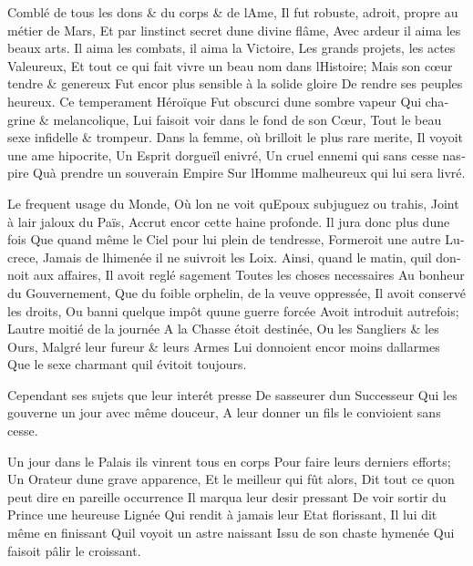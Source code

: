 \documentclass[14pt,a4paper]{memoir}
\begin{document}
{{\begin{otherlanguage}{french}
{Comblé de tous les dons \& du corps \& de l\textquotesingle Ame,} {Il
fut robuste, adroit, propre au métier de Mars, } {Et par
l\textquotesingle instinct secret d\textquotesingle une divine flâme,}
{Avec ardeur il aima les beaux arts.} {Il aima les combats, il aima la
Victoire,} {Les grands projets, les actes Valeureux,} {Et tout ce qui
fait vivre un beau nom dans l\textquotesingle Histoire;} {Mais son cœur
tendre \& genereux} {Fut encor plus sensible à la solide gloire} {De
rendre ses peuples heureux.} {Ce temperament Héroïque} {Fut obscurci
d\textquotesingle une sombre vapeur} {Qui chagrine \& melancolique,}
{Lui faisoit voir dans le fond de son Cœur, } {Tout le beau sexe
infidelle \& trompeur.} {Dans la femme, où brilloit le plus rare merite,
} {Il voyoit une ame hipocrite,} {Un Esprit d\textquotesingle orgueïl
enivré,} {Un cruel ennemi qui sans cesse n\textquotesingle aspire}
{Qu\textquotesingle à prendre un souverain Empire} {Sur
l\textquotesingle Homme malheureux qui lui sera livré.}

{Le frequent usage du Monde,} {Où l\textquotesingle on ne voit
qu\textquotesingle Epoux subjuguez ou trahis,} {Joint à
l\textquotesingle air jaloux du Païs,} {Accrut encor cette haine
profonde.} {Il jura donc plus d\textquotesingle une fois} {Que quand
même le Ciel pour lui plein de tendresse,} {Formeroit une autre
Lucrece,} {Jamais de l\textquotesingle himenée il ne suivroit les Loix.}
{Ainsi, quand le matin, qu\textquotesingle il donnoit aux affaires,} {Il
avoit reglé sagement} {Toutes les choses necessaires} {Au bonheur du
Gouvernement,} {Que du foible orphelin, de la veuve oppressée,} {Il
avoit conservé les droits,} {Ou banni quelque impôt
qu\textquotesingle une guerre forcée} {Avoit introduit autrefois;}
{L\textquotesingle autre moitié de la journée} {A la Chasse étoit
destinée,} {Ou les Sangliers \& les Ours,} {Malgré leur fureur \& leurs
Armes} {Lui donnoient encor moins d\textquotesingle allarmes} {Que le
sexe charmant qu\textquotesingle il évitoit toujours.}

{Cependant ses sujets que leur interét presse} {De
s\textquotesingle asseurer d\textquotesingle un Successeur} {Qui les
gouverne un jour avec même douceur,} {A leur donner un fils le
convioient sans cesse. }

{Un jour dans le Palais ils vinrent tous en corps } {Pour faire leurs
derniers efforts;} {Un Orateur d\textquotesingle une grave apparence,}
{Et le meilleur qui fût alors,} {Dit tout ce qu\textquotesingle on peut
dire en pareille occurrence} {Il marqua leur desir pressant} {De voir
sortir du Prince une heureuse Lignée} {Qui rendit à jamais leur Etat
florissant,} {Il lui dit même en finissant} {Qu\textquotesingle il
voyoit un astre naissant} {Issu de son chaste hymenée} {Qui faisoit
pâlir le croissant.}


\end{otherlanguage}}}
\end{document}
